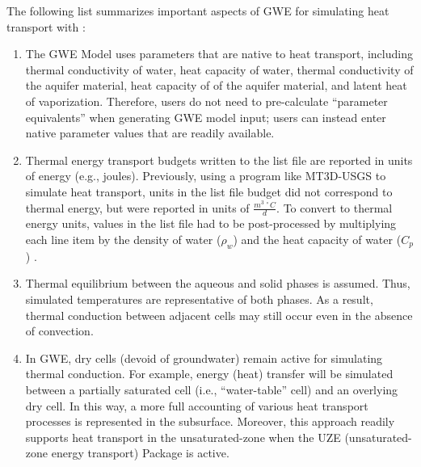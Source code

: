 The following list summarizes important aspects of GWE for simulating heat transport with \mf:

\begin{enumerate}

\item The GWE Model uses parameters that are native to heat transport, including thermal conductivity of water, heat capacity of water, thermal conductivity of the aquifer material, heat capacity of of the aquifer material, and latent heat of vaporization. Therefore, users do not need to pre-calculate ``parameter equivalents'' when generating GWE model input; users can instead enter native parameter values that are readily available.

\item Thermal energy transport budgets written to the \mf list file are reported in units of energy (e.g., joules).  Previously, using a program like MT3D-USGS \citep{mt3dusgs} to simulate heat transport, units in the list file budget did not correspond to thermal energy, but were reported in units of $\frac{m^{3 \;\circ}C}{d}$. To convert to thermal energy units, values in the list file had to be post-processed by multiplying each line item by the density of water ($\rho_w$) and the heat capacity of water ($C_p$) \citep{langevin2008seawat}.

\item Thermal equilibrium between the aqueous and solid phases is assumed.  Thus, simulated temperatures are representative of both phases.  As a result, thermal conduction between adjacent cells may still occur even in the absence of convection.

\item In GWE, dry cells (devoid of groundwater) remain active for simulating thermal conduction. For example, energy (heat) transfer will be simulated between a partially saturated cell (i.e., ``water-table'' cell) and an overlying dry cell. In this way, a more full accounting of various heat transport processes is represented in the subsurface.  Moreover, this approach readily supports heat transport in the unsaturated-zone when the UZE (unsaturated-zone energy transport) Package is active.  


\end{enumerate}

